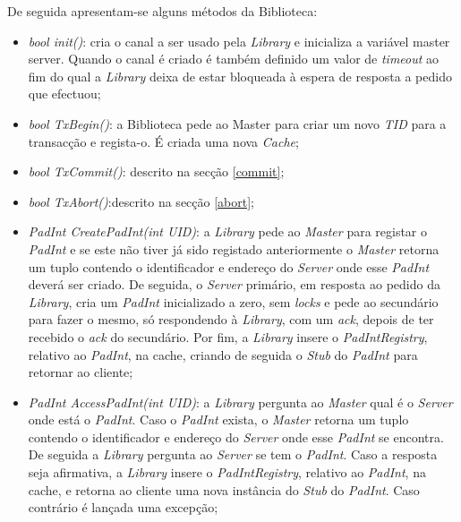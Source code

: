 De seguida apresentam-se alguns métodos da Biblioteca:
\begin{itemize}
\item \textit{bool init()}: cria o canal a ser usado pela \textit{Library} e inicializa a variável master server. Quando o canal é criado é também definido um valor de \textit{timeout} ao fim do qual a \textit{Library} deixa de estar bloqueada à espera de resposta a pedido que efectuou;

\item \textit{bool TxBegin()}: a Biblioteca pede ao Master para criar um novo \textit{TID} para a transacção e regista-o. É criada uma nova \textit{Cache};

\item \textit{bool TxCommit()}: descrito na secção \ref{commit};

\item \textit{bool TxAbort()}:descrito na secção \ref{abort};

\item \textit{PadInt CreatePadInt(int UID)}: a \textit{Library} pede ao \textit{Master} para registar o \textit{PadInt} e se este não tiver já sido registado anteriormente o \textit{Master} retorna um tuplo contendo o identificador e endereço do \textit{Server} onde esse \textit{PadInt} deverá ser criado. De seguida, o \textit{Server} primário, em resposta ao pedido da \textit{Library}, cria um \textit{PadInt} inicializado a zero, sem \textit{locks} e pede ao secundário para fazer o mesmo, só respondendo à \textit{Library}, com um \textit{ack}, depois de ter recebido o \textit{ack} do secundário. Por fim, a \textit{Library} insere o \textit{PadIntRegistry}, relativo ao \textit{PadInt}, na cache, criando de seguida o \textit{Stub} do \textit{PadInt} para retornar ao cliente;

\item \textit{PadInt AccessPadInt(int UID)}: a \textit{Library} pergunta ao \textit{Master} qual é o \textit{Server} onde está o \textit{PadInt}. Caso o \textit{PadInt} exista,  o \textit{Master} retorna um tuplo contendo o identificador e endereço do \textit{Server} onde esse \textit{PadInt} se encontra. De seguida a \textit{Library} pergunta ao \textit{Server} se tem o \textit{PadInt}. Caso a resposta seja afirmativa, a \textit{Library} insere o \textit{PadIntRegistry}, relativo ao \textit{PadInt}, na cache,  e retorna ao cliente uma nova instância do \textit{Stub} do \textit{PadInt}. Caso contrário é lançada uma excepção;
\end{itemize}

